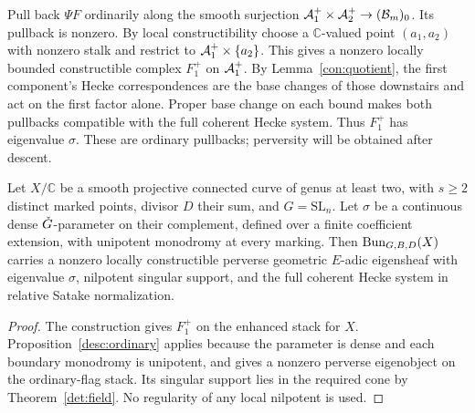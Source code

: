 Pull back $\Psi F$ ordinarily along the smooth surjection
$\mathcal A_1^+\times\mathcal A_2^+\to(\mathcal B_m)_0$.  Its pullback is nonzero.
By local constructibility choose a $\mathbb C$-valued point
$(a_1,a_2)$ with nonzero stalk and restrict to
$\mathcal A_1^+\times\{a_2\}$.  This gives a nonzero locally bounded
constructible complex $F_1^+$ on $\mathcal A_1^+$.  By
Lemma~\ref{con:quotient}, the first component's Hecke correspondences
are the base changes of those downstairs and act on the first
factor alone.  Proper base change on each bound makes both
pullbacks compatible with the full coherent Hecke system.  Thus
$F_1^+$ has eigenvalue $\sigma$.  These are ordinary pullbacks;
perversity will be obtained after descent.

\begin{proposition}\label{con:charzero}
Let $X/\mathbb C$ be a smooth projective connected curve of genus
at least two, with $s\geq2$ distinct marked points, divisor $D$ their
sum, and $G=\mathrm{SL}_n$.
Let $\sigma$ be a continuous dense $\check G$-parameter on their
complement, defined over a finite coefficient extension, with
unipotent monodromy at every marking.  Then
$\operatorname{Bun}_{G,B,D}(X)$ carries a nonzero locally constructible perverse
geometric $E$-adic eigensheaf with eigenvalue $\sigma$, nilpotent
singular support, and the full coherent Hecke system in relative
Satake normalization.
\end{proposition}

\begin{proof}
The construction gives $F_1^+$ on the enhanced stack for $X$.
Proposition~\ref{desc:ordinary} applies because the parameter is
dense and each boundary monodromy is unipotent, and gives a nonzero
perverse eigenobject on the ordinary-flag stack.  Its singular
support lies in the required cone by Theorem~\ref{det:field}.
No regularity of any local nilpotent is used.
\end{proof}
